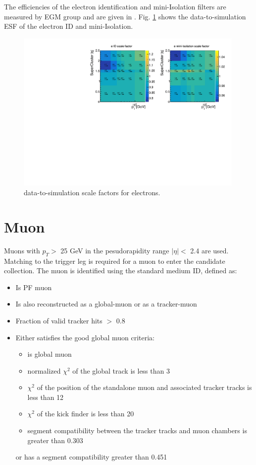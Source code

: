 \documentclass[thesis.tex]{subfiles}
\renewcommand\_{\textunderscore\allowbreak}
\begin{document}
The efficiencies of the electron identification and mini-Isolation filters are measured by EGM group and are given in \cite{EGM:leptonScale}. Fig. \ref{fig:elesf} shows the data-to-simulation ESF of the electron ID and mini-Isolation. 

\begin{figure}[hbt]
	\centering
	\includegraphics[width=0.99\textwidth]{plot/SF_Ele.pdf}
	\caption{data-to-simulation scale factors for electrons.}
	\label{fig:elesf}
\end{figure}

\section{Muon}
Muons with $p_{T} >$ 25 GeV in the pesudorapidity range $|\eta| <$ 2.4 are used. 
Matching to the trigger leg is required for a muon to enter the candidate collection. 
The muon is identified using the standard medium ID, defined as:

\begin{center}
\begin{itemize}
\item Is PF muon
\item Is also reconstructed as a global-muon or as a tracker-muon
\item Fraction of valid tracker hits $>$ 0.8
\item Either satisfies the good global muon criteria:
	\begin{itemize}
		\item is global muon
		\item normalized $\chi^2$ of the global track is less than 3
		\item $\chi^2$ of the position of the standalone muon and associated tracker tracks is less than 12
		\item $\chi^2$ of the kick finder is less than 20
		\item segment compatibility between the tracker tracks and muon chambers is greater than 0.303
	\end{itemize} 
	or has a segment compatibility greater than 0.451
\end{itemize}
\end{center}
\end{document}
